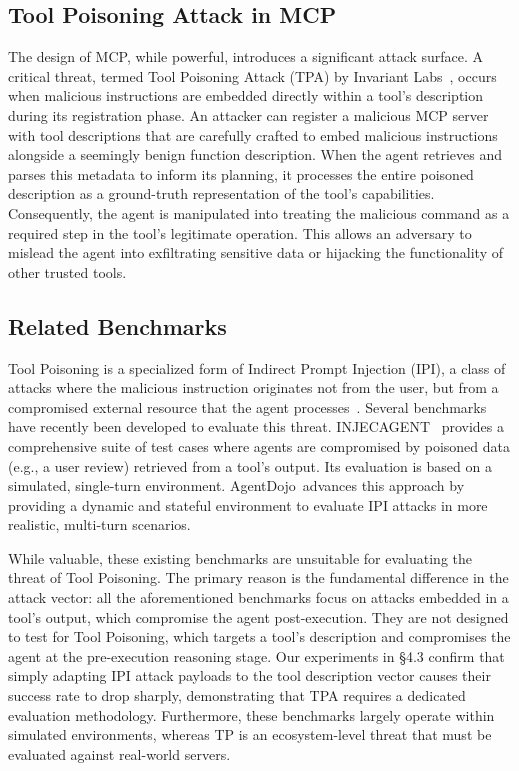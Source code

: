 \subsection{Tool Poisoning Attack in MCP}
The design of MCP, while powerful, introduces a significant attack surface. A critical threat, termed Tool Poisoning Attack (TPA) by Invariant Labs~\cite{InvariantLabs_TPA_2025}, occurs when malicious instructions are embedded directly within a tool's description during its registration phase. An attacker can register a malicious MCP server with tool descriptions that are carefully crafted to embed malicious instructions alongside a seemingly benign function description. When the agent retrieves and parses this metadata to inform its planning, it processes the entire poisoned description as a ground-truth representation of the tool's capabilities. Consequently, the agent is manipulated into treating the malicious command as a required step in the tool's legitimate operation. This allows an adversary to mislead the agent into exfiltrating sensitive data or hijacking the functionality of other trusted tools.

\subsection{Related Benchmarks}
Tool Poisoning is a specialized form of Indirect Prompt Injection (IPI), a class of attacks where the malicious instruction originates not from the user, but from a compromised external resource that the agent processes~\cite{greshake2023youvesignedforcompromising}. Several benchmarks have recently been developed to evaluate this threat. 
INJECAGENT~\cite{zhan2024injecagentbenchmarkingindirectprompt} provides a comprehensive suite of test cases where agents are compromised by poisoned data (e.g., a user review) retrieved from a tool's output. Its evaluation is based on a simulated, single-turn environment. AgentDojo~\cite{debenedetti2024agentdojo}advances this approach by providing a dynamic and stateful environment to evaluate IPI attacks in more realistic, multi-turn scenarios.

While valuable, these existing benchmarks are unsuitable for evaluating the threat of Tool Poisoning. The primary reason is the fundamental difference in the attack vector: all the aforementioned benchmarks focus on attacks embedded in a tool's output, which compromise the agent post-execution. They are not designed to test for Tool Poisoning, which targets a tool's description and compromises the agent at the pre-execution reasoning stage. Our experiments in \S 4.3 confirm that simply adapting IPI attack payloads to the tool description vector causes their success rate to drop sharply, demonstrating that TPA requires a dedicated evaluation methodology. Furthermore, these benchmarks largely operate within simulated environments, whereas TP is an ecosystem-level threat that must be evaluated against real-world servers.

